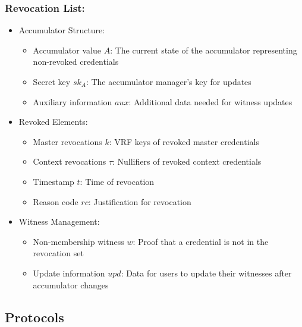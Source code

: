 \subsubsection{Revocation List:} 
\begin{itemize}
    \item Accumulator Structure:
    \begin{itemize}
        \item Accumulator value $A$: The current state of the accumulator representing non-revoked credentials
        \item Secret key $sk_A$: The accumulator manager's key for updates
        \item Auxiliary information $aux$: Additional data needed for witness updates
    \end{itemize}
    \item Revoked Elements:
    \begin{itemize}
        \item Master revocations $k$: VRF keys of revoked master credentials
        \item Context revocations $\tau$: Nullifiers of revoked context credentials
        \item Timestamp $t$: Time of revocation
        \item Reason code $rc$: Justification for revocation
    \end{itemize}
    \item Witness Management:
    \begin{itemize}
        \item Non-membership witness $w$: Proof that a credential is not in the revocation set
        \item Update information $upd$: Data for users to update their witnesses after accumulator changes
    \end{itemize}
\end{itemize}









\newpage
\subsection{Protocols}









\newpage
